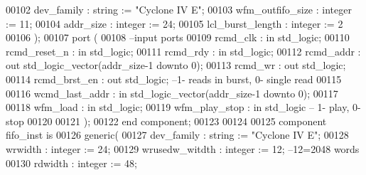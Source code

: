 \begin{DoxyCode}
00102             dev_family          : \textcolor{comment}{string}  := \textcolor{keyword}{"Cyclone IV E"}; 
00103             wfm_outfifo_size    : \textcolor{comment}{integer} := \textcolor{vhdllogic}{}\textcolor{vhdllogic}{11};
00104             addr_size           : \textcolor{comment}{integer} := \textcolor{vhdllogic}{}\textcolor{vhdllogic}{24};
00105             lcl_burst_length    : \textcolor{comment}{integer} := \textcolor{vhdllogic}{}\textcolor{vhdllogic}{2}
00106 );
00107   \textcolor{keywordflow}{port} (
00108 \textcolor{keyword}{      --input ports }
00109         rcmd_clk                    : \textcolor{keywordflow}{in} \textcolor{comment}{std\_logic};
00110         rcmd_reset_n            : \textcolor{keywordflow}{in} \textcolor{comment}{std\_logic};
00111         rcmd_rdy                    : \textcolor{keywordflow}{in} \textcolor{comment}{std\_logic};
00112         rcmd_addr               : \textcolor{keywordflow}{out} \textcolor{comment}{std\_logic\_vector}(addr_size\textcolor{vhdlchar}{-}\textcolor{vhdllogic}{}\textcolor{vhdllogic}{1} \textcolor{keywordflow}{downto} \textcolor{vhdllogic}{}\textcolor{vhdllogic}{0});
00113         rcmd_wr                 : \textcolor{keywordflow}{out} \textcolor{comment}{std\_logic};
00114         rcmd_brst_en            : \textcolor{keywordflow}{out} \textcolor{comment}{std\_logic}; \textcolor{keyword}{--1- reads in burst, 0- single read}
00115 
00116         wcmd_last_addr          : \textcolor{keywordflow}{in} \textcolor{comment}{std\_logic\_vector}(addr_size\textcolor{vhdlchar}{-}\textcolor{vhdllogic}{}\textcolor{vhdllogic}{1} \textcolor{keywordflow}{downto} \textcolor{vhdllogic}{}\textcolor{vhdllogic}{0});
00117  
00118         wfm_load                    : \textcolor{keywordflow}{in} \textcolor{comment}{std\_logic};
00119         wfm_play_stop           : \textcolor{keywordflow}{in} \textcolor{comment}{std\_logic}\textcolor{keyword}{ -- 1- play, 0- stop}
00120         
00121         );
00122 \textcolor{keywordflow}{end} \textcolor{keywordflow}{component};
00123 
00124 
00125 \textcolor{keywordflow}{component}  fifo_inst \textcolor{keywordflow}{is}
00126   \textcolor{keywordflow}{generic}(
00127         dev_family          : \textcolor{comment}{string}  := \textcolor{keyword}{"Cyclone IV E"};
00128         wrwidth             : \textcolor{comment}{integer} := \textcolor{vhdllogic}{}\textcolor{vhdllogic}{24};
00129         wrusedw_witdth      : \textcolor{comment}{integer} := \textcolor{vhdllogic}{}\textcolor{vhdllogic}{12}; \textcolor{keyword}{--12=2048 words }
00130         rdwidth             : \textcolor{comment}{integer} := \textcolor{vhdllogic}{}\textcolor{vhdllogic}{48};

\end{DoxyCode}
